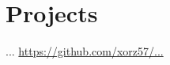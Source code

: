 \section{Projects}

\begin{cventries}
    \cventryiv
        {...}
        {}
        {\url{https://github.com/xorz57/...}}
        {}
\end{cventries}
